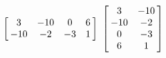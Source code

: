 {$\left[\hskip -3pt \begin{array}{cccc} 3&-10&0&6\\  -10&-2&-3&1
\end{array}\hskip -3pt \right] $}
{$\left[\hskip -3pt \begin{array}{cc} 3&-10\\  -10&-2
\\  0&-3\\  6&1\end{array}\hskip -3pt \right]$}

